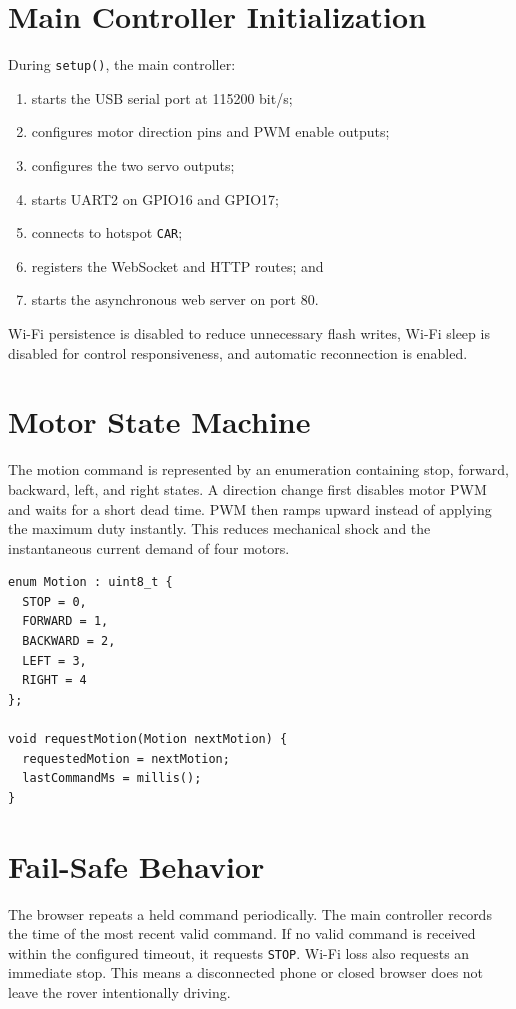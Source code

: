 \documentclass[12pt,a4paper,oneside]{report}
\newcommand{\code}[1]{\texttt{#1}}
\begin{document}
\section{Main Controller Initialization}
During \code{setup()}, the main controller:

\begin{enumerate}
  \item starts the USB serial port at 115200 bit/s;
  \item configures motor direction pins and PWM enable outputs;
  \item configures the two servo outputs;
  \item starts UART2 on GPIO16 and GPIO17;
  \item connects to hotspot \code{CAR};
  \item registers the WebSocket and HTTP routes; and
  \item starts the asynchronous web server on port 80.
\end{enumerate}

Wi-Fi persistence is disabled to reduce unnecessary flash writes, Wi-Fi sleep
is disabled for control responsiveness, and automatic reconnection is enabled.

\section{Motor State Machine}
The motion command is represented by an enumeration containing stop, forward,
backward, left, and right states. A direction change first disables motor PWM
and waits for a short dead time. PWM then ramps upward instead of applying the
maximum duty instantly. This reduces mechanical shock and the instantaneous
current demand of four motors.

\begin{lstlisting}[style=cppstyle,caption={Simplified command-to-motion interface}]
enum Motion : uint8_t {
  STOP = 0,
  FORWARD = 1,
  BACKWARD = 2,
  LEFT = 3,
  RIGHT = 4
};

void requestMotion(Motion nextMotion) {
  requestedMotion = nextMotion;
  lastCommandMs = millis();
}
\end{lstlisting}

\section{Fail-Safe Behavior}
The browser repeats a held command periodically. The main controller records
the time of the most recent valid command. If no valid command is received
within the configured timeout, it requests \code{STOP}. Wi-Fi loss also requests
an immediate stop. This means a disconnected phone or closed browser does not
leave the rover intentionally driving.
\end{document}
